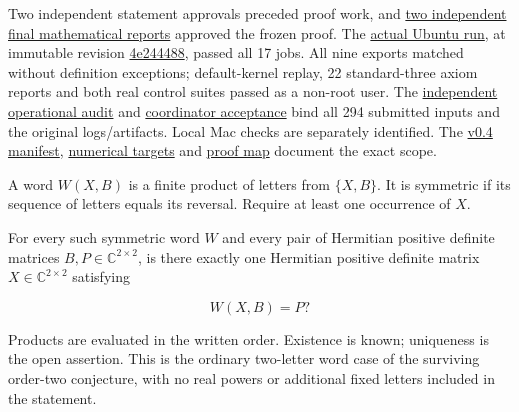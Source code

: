 \documentclass[11pt,a4paper]{article}
\makeatletter
\renewcommand{\subsection}{\Needspace{4\baselineskip}\@startsection{subsection}{2}{0pt}{9pt plus 1pt minus 1pt}{3pt}{\sffamily\bfseries\normalsize\color{ink}}}
\makeatother
\begin{document}
Two independent statement approvals preceded proof work, and
\href{https://github.com/ajt60gaibb/OpenProblemsInNLA/blob/main/matrix-functions-and-stability/MF-16/lean/README.md\#review-and-checks-actually-performed}{two
independent final mathematical reports} approved the frozen proof. The
\href{https://github.com/sgstepaniants/OpenProblemsInNLA/actions/runs/34735259429}{actual
Ubuntu run}, at immutable revision
\href{https://github.com/sgstepaniants/OpenProblemsInNLA/tree/4e24448897a088ca9e7458379add1014c5d11e0c/matrix-functions-and-stability/MF-16/lean}{4e244488},
passed all 17 jobs. All nine exports matched without definition
exceptions; default-kernel replay, 22 standard-three axiom reports and
both real control suites passed as a non-root user. The
\href{https://github.com/ajt60gaibb/OpenProblemsInNLA/blob/main/matrix-functions-and-stability/MF-16/lean/verification/linux-2026-09-12/OPERATIONAL-REVIEW.md}{independent
operational audit} and
\href{https://github.com/ajt60gaibb/OpenProblemsInNLA/blob/main/matrix-functions-and-stability/MF-16/lean/verification/root-operational-2026-09-12/ROOT-CHECKS.json}{coordinator
acceptance} bind all 294 submitted inputs and the original
logs/artifacts. Local Mac checks are separately identified. The
\href{https://github.com/ajt60gaibb/OpenProblemsInNLA/blob/main/matrix-functions-and-stability/MF-16/lean/formalization.yaml}{v0.4
manifest},
\href{https://github.com/ajt60gaibb/OpenProblemsInNLA/blob/main/matrix-functions-and-stability/MF-16/lean/NUMERICAL_TARGETS.md}{numerical
targets} and
\href{https://github.com/ajt60gaibb/OpenProblemsInNLA/blob/main/matrix-functions-and-stability/MF-16/lean/verification/PROOF_MAP.md}{proof
map} document the exact scope.

\subsection{Problem statement}\label{problem-statement}

A word \(W(X,B)\) is a finite product of letters from \(\{X,B\}\). It is
symmetric if its sequence of letters equals its reversal. Require at
least one occurrence of \(X\).

For every such symmetric word \(W\) and every pair of Hermitian positive
definite matrices \(B,P\in\mathbb C^{2\times2}\), is there exactly one
Hermitian positive definite matrix \(X\in\mathbb C^{2\times2}\)
satisfying

\[W(X,B)=P?\]

Products are evaluated in the written order. Existence is known;
uniqueness is the open assertion. This is the ordinary two-letter word
case of the surviving order-two conjecture, with no real powers or
additional fixed letters included in the statement.
\end{document}
